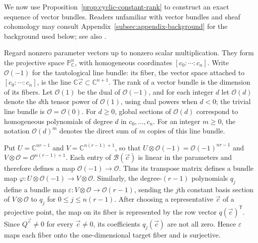 \documentclass[12pt,reqno,a4paper]{amsart}
\numberwithin{equation}{section}
\numberwithin{figure}{section}
\theoremstyle{plain}
\theoremstyle{definition}
\begin{document}
We now use Proposition~\ref{prop:cyclic-constant-rank} to construct
an exact sequence of vector bundles.
Readers unfamiliar with vector bundles and sheaf cohomology may
consult Appendix~\ref{subsec:appendix-background} for the background
used below; see also \cite[Chapter~II, \S5]{Hartshorne}.

Regard nonzero parameter vectors up to nonzero scalar multiplication.
They form the projective space $\mathbb P^n_{\mathbb C}$, with
homogeneous coordinates $[c_0:\cdots:c_n]$.
Write $\mathcal O(-1)$ for the tautological line bundle: its fiber,
the vector space attached to $[c_0:\cdots:c_n]$, is the line
$\mathbb C\vec c\subset\mathbb C^{n+1}$.
The rank of a vector bundle is the dimension of its fibers.
Let $\mathcal O(1)$ be the dual of $\mathcal O(-1)$, and for each integer $d$ let
$\mathcal O(d)$ denote the $d$th tensor power of $\mathcal O(1)$,
using dual powers when $d<0$; the trivial line bundle is
$\mathcal O=\mathcal O(0)$.
For $d\ge0$, global sections of $\mathcal O(d)$ correspond to
homogeneous polynomials of degree $d$ in $c_0,\ldots,c_n$.
For an integer $m\ge0$, the notation $\mathcal O(d)^m$ denotes the direct sum
of $m$ copies of this line bundle.

Put $U=\mathbb C^{nr-1}$ and $V=\mathbb C^{n(r-1)+1}$, so that
$U\otimes\mathcal O(-1)=\mathcal O(-1)^{nr-1}$ and
$V\otimes\mathcal O=\mathcal O^{n(r-1)+1}$.
Each entry of $\mathcal B(\vec c)$ is linear in the parameters and
therefore defines a map $\mathcal O(-1)\to\mathcal O$.
Thus its transpose matrix defines a bundle map
$\varphi:U\otimes\mathcal O(-1)\to V\otimes\mathcal O$.
Similarly, the degree-$(r-1)$ polynomials $q_j$ define a bundle map
$\varepsilon:V\otimes\mathcal O\to\mathcal O(r-1)$, sending
the $j$th constant basis section of $V\otimes\mathcal O$ to $q_j$ for
$0\le j\le n(r-1)$. After choosing a representative $\vec c$ of
a projective point, the map on its fiber is represented by the
row vector $q(\vec c)^{\mathsf T}$.
Since $Q^{\vec c}\ne0$ for every $\vec c\ne0$, its coefficients
$q_j(\vec c)$ are not all zero. Hence $\varepsilon$ maps each
fiber onto the one-dimensional target fiber and is surjective.
\end{document}
